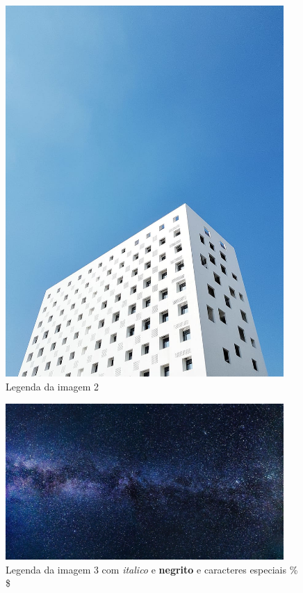 \documentclass{article}
\begin{document}
\begin{figure}[h]
\includegraphics[width=400px]{ Image2.jpg }
\caption{ Legenda da imagem 2 } 
\end{figure}


\begin{figure}[h]
\includegraphics[width=400px]{ Image3.jpg }
\caption{ Legenda da imagem 3 com \textit{ italico } e \textbf{ negrito } e caracteres especiais \% \$ } 
\end{figure}
\end{document}
